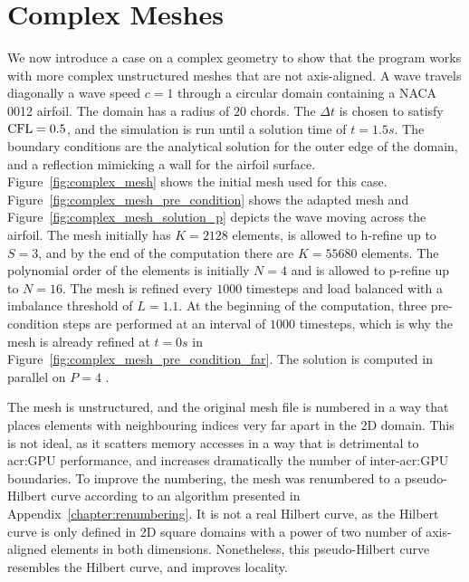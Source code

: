 \section{Complex Meshes}\label{section:results:complex_meshes}

We now introduce a case on a complex geometry to show that the program works with more complex
unstructured meshes that are not axis-aligned. A wave travels diagonally a wave speed \(c = 1\)
through a circular domain containing a NACA 0012 airfoil. The domain has a radius of \(20\) chords.
The \(\Delta t\) is chosen to satisfy \(\operatorname{CFL} = 0.5\), and the simulation is run until a solution
time of \(t = 1.5 s\). The boundary conditions are the analytical solution for the outer edge of the
domain, and a reflection mimicking a wall for the airfoil surface. Figure~\ref{fig:complex_mesh}
shows the initial mesh used for this case. Figure~\ref{fig:complex_mesh_pre_condition} shows the
adapted mesh and Figure~\ref{fig:complex_mesh_solution_p} depicts the wave moving across the
airfoil. The mesh initially has \(K = 2128\) elements, is allowed to h-refine up to \(S = 3\), and
by the end of the computation there are \(K = 55680\) elements. The polynomial order of the elements
is initially \(N = 4\) and is allowed to p-refine up to \(N = 16\). The mesh is refined every
\(1000\) timesteps and load balanced with a imbalance threshold of \(L = 1.1\). At the beginning of
the computation, three pre-condition steps are performed at an interval of \(1000\) timesteps, which
is why the mesh is already refined at \(t = 0 s\) in
Figure~\ref{fig:complex_mesh_pre_condition_far}. The solution is computed in parallel on \(P = 4\)
.

The mesh is unstructured, and the original mesh file is numbered in a way that places elements with
neighbouring indices very far apart in the 2D domain. This is not ideal, as it scatters memory
accesses in a way that is detrimental to \acrshort{acr:GPU} performance, and increases dramatically
the number of inter-\acrshort{acr:GPU} boundaries. To improve the numbering, the mesh was renumbered
to a pseudo-Hilbert curve according to an algorithm presented in Appendix~\ref{chapter:renumbering}.
It is not a real Hilbert curve, as the Hilbert curve is only defined in 2D square domains with a
power of two number of axis-aligned elements in both dimensions. Nonetheless, this pseudo-Hilbert
curve resembles the Hilbert curve, and improves locality.

